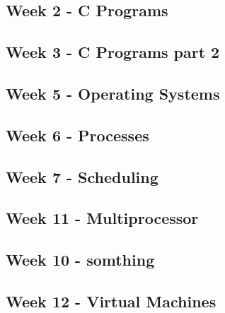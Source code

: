 
\subsection*{Week 2 - C Programs}



\subsection*{Week 3 - C Programs part 2}



\subsection*{Week 5 - Operating Systems}



\subsection*{Week 6 - Processes}



\subsection*{Week 7 - Scheduling}


\subsection*{Week 11 - Multiprocessor}


\subsection*{Week 10 - somthing}


\subsection*{Week 12 - Virtual Machines}

